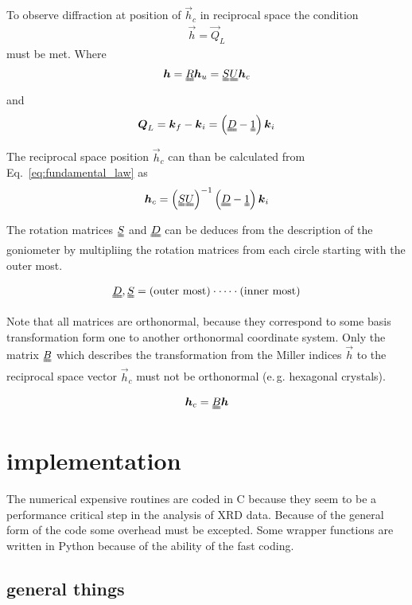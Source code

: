 To observe diffraction at position of $\vec h_c$ in reciprocal space the condition
\begin{align}
 \vec h = \vec Q_L
\label{eq:fundamental_law}
\end{align}
must be met. Where
\begin{align}
 \vec h = \mat R \vec h_u = \mat S \mat U \vec h_c
\end{align}
and 
\begin{align}
 \vec Q_L = \vec k_f - \vec k_i = \left( \mat D - \mat 1 \right) \vec k_i
\end{align}

The reciprocal space position $\vec h_c$ can than be calculated from Eq.~\ref{eq:fundamental_law} as
\begin{align}
 \vec h_c = \left( \mat S \mat U \right)^{-1} \left(\mat D - \mat 1 \right) \vec k_i
 \label{eq:momentum_space_conversion}
\end{align}

The rotation matrices $\mat S$ and $\mat D$ can be deduces from the description of the goniometer by multipliing the rotation matrices from each circle starting with the outer most.

\begin{align}
 \mat D, \mat S = \text{(outer most)} \cdot \dots \cdot \text{(inner most)}
\end{align}

Note that all matrices are orthonormal, because they correspond to some basis transformation form one to another orthonormal coordinate system. Only the matrix $\mat B$ which describes the transformation from the Miller indices $\vec h$ to the reciprocal space vector $\vec h_c$ must not be orthonormal (e.\,g. hexagonal crystals).

\begin{align}
 \vec h_c = \mat B \vec h
\end{align}

\section{implementation}

The numerical expensive routines are coded in C because they seem to be a performance critical step in the analysis of XRD data. Because of the general form of the code some overhead must be excepted. Some wrapper functions are written in Python because of the ability of the fast coding. 

\subsection*{general things}

